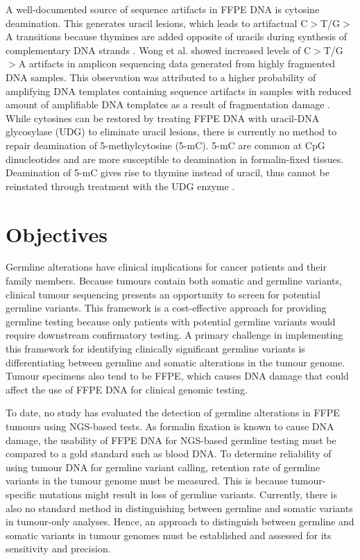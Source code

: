 A well-documented source of sequence artifacts in FFPE DNA is cytosine deamination. This generates uracil lesions, which leads to artifactual C$>$T/G$>$A transitions because thymines are added opposite of uracils during synthesis of complementary DNA strands \cite{Do2015a}. Wong et al. \cite{Wong2014} showed increased levels of C$>$T/G$>$A artifacts in amplicon sequencing data generated from highly fragmented DNA samples. This observation was attributed to a higher probability of amplifying DNA templates containing sequence artifacts in samples with reduced amount of amplifiable DNA templates as a result of fragmentation damage \cite{Wong2014}. While cytosines can be restored by treating FFPE DNA with uracil-DNA glycosylase (\acs{UDG}) to eliminate uracil lesions, there is currently no method to repair deamination of 5-methylcytosine (5-mC). 5-mC are common at CpG dinucleotides and are more susceptible to deamination in formalin-fixed tissues. Deamination of 5-mC gives rise to thymine instead of uracil, thus cannot be reinstated through treatment with the UDG enzyme \cite{Do2015a}.

\section{Objectives}
\label{sec:Objectives}

Germline alterations have clinical implications for cancer patients and their family members. Because tumours contain both somatic and germline variants, clinical tumour sequencing presents an opportunity to screen for potential germline variants. This framework is a cost-effective approach for providing germline testing because only patients with potential germline variants would require downstream confirmatory testing. A primary challenge in implementing this framework for identifying clinically significant germline variants is differentiating between germline and somatic alterations in the tumour genome. Tumour specimens also tend to be FFPE, which causes DNA damage that could affect the use of FFPE DNA for clinical genomic testing.

To date, no study has evaluated the detection of germline alterations in FFPE tumours using NGS-based tests. As formalin fixation is known to cause DNA damage, the usability of FFPE DNA for NGS-based germline testing must be compared to a gold standard such as blood DNA. To determine reliability of using tumour DNA for germline variant calling, retention rate of germline variants in the tumour genome must be measured. This is because tumour-specific mutations might result in loss of germline variants. Currently, there is also no standard method in distinguishing between germline and somatic variants in tumour-only analyses. Hence, an approach to distinguish between germline and somatic variants in tumour genomes must be established and assessed for its sensitivity and precision.

